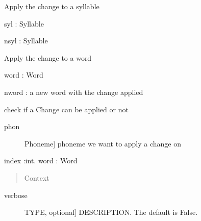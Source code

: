 \documentclass[letterpaper,10pt,english]{sphinxmanual}
\begin{document}
\begin{fulllineitems}
\begin{fulllineitems}
\end{fulllineitems}


\begin{fulllineitems}
\label{\detokenize{index:Change.Change.apply_syl}}
\sphinxAtStartPar
Apply the change to a syllable

\sphinxAtStartPar
syl : Syllable

\sphinxAtStartPar
nsyl : Syllable

\end{fulllineitems}


\begin{fulllineitems}
\label{\detokenize{index:Change.Change.apply_word}}
\sphinxAtStartPar
Apply the change to a word

\sphinxAtStartPar
word : Word

\sphinxAtStartPar
nword : a new word with the change applied

\end{fulllineitems}


\begin{fulllineitems}
\label{\detokenize{index:Change.Change.check}}
\sphinxAtStartPar
check if a Change can be applied or not
\begin{description}
\item[{phon}] \leavevmode{[}Phoneme{]}
\sphinxAtStartPar
phoneme we want to apply a change on

\end{description}

\sphinxAtStartPar
index :int.
word : Word
\begin{quote}

\sphinxAtStartPar
Context
\end{quote}
\begin{description}
\item[{verbose}] \leavevmode{[}TYPE, optional{]}
\sphinxAtStartPar
DESCRIPTION. The default is False.


\end{description}
\end{fulllineitems}
\end{fulllineitems}
\end{document}
